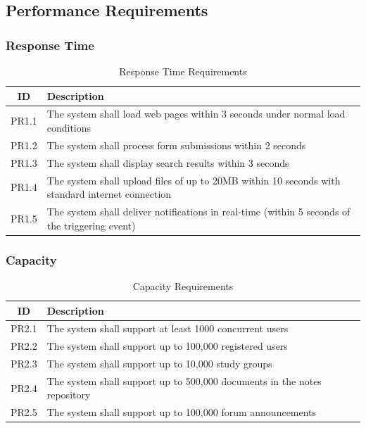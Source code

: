 \documentclass{article}
\begin{document}
\subsection{Performance Requirements}

\subsubsection{Response Time}
\begin{table}[h!]
\centering
\begin{tabular}{|c|p{10cm}|}
\hline
\textbf{ID} & \textbf{Description} \\
\hline
PR1.1 & The system shall load web pages within 3 seconds under normal load conditions \\
PR1.2 & The system shall process form submissions within 2 seconds \\
PR1.3 & The system shall display search results within 3 seconds \\
PR1.4 & The system shall upload files of up to 20MB within 10 seconds with standard internet connection \\
PR1.5 & The system shall deliver notifications in real-time (within 5 seconds of the triggering event) \\
\hline
\end{tabular}
\caption{Response Time Requirements}
\label{tab: response_time}
\end{table}


\subsubsection{Capacity}

\begin{table}[h!]
    \centering
    \begin{tabular}{|c|p{10cm}|}
    \hline
    \textbf{ID} & \textbf{Description} \\
    \hline
    PR2.1 & The system shall support at least 1000 concurrent users \\
    PR2.2 & The system shall support up to 100,000 registered users \\
    PR2.3 & The system shall support up to 10,000 study groups \\
    PR2.4 & The system shall support up to 500,000 documents in the notes repository \\
    PR2.5 & The system shall support up to 100,000 forum announcements \\
    \hline
    \end{tabular}
    \caption{Capacity Requirements}
    \label{tab: Capacity}
\end{table}
\end{document}
